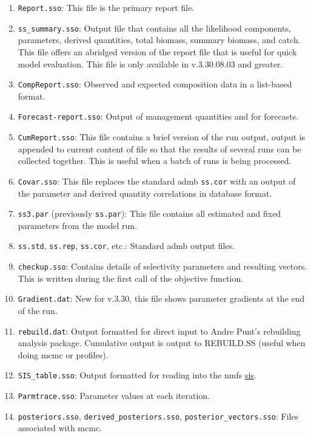 \begin{enumerate}
	\item \texttt{Report.sso}: This file is the primary report file.
	\item \texttt{ss\_summary.sso}: Output file that contains all the likelihood components, parameters, derived quantities, total biomass, summary biomass, and catch. This file offers an abridged version of the report file that is useful for quick model evaluation. This file is only available in v.3.30.08.03 and greater.
	\item \texttt{CompReport.sso}: Observed and expected composition data in a list-based format.
	\item \texttt{Forecast-report.sso}: Output of management quantities and for forecasts.
	\item \texttt{CumReport.sso}: This file contains a brief version of the run output, output is appended to current content of file so that the results of several runs can be collected together. This is useful when a batch of runs is being processed.
	\item \texttt{Covar.sso}: This file replaces the standard \gls{admb} \texttt{ss.cor} with an output of the parameter and derived quantity correlations in database format.
	\item \texttt{ss3.par} (previously \texttt{ss.par}): This file contains all estimated and fixed parameters from the model run. 
	\item \texttt{ss.std}, \texttt{ss.rep}, \texttt{ss.cor}, etc.: Standard \gls{admb} output files.
	\item \texttt{checkup.sso}: Contains details of selectivity parameters and resulting vectors. This is written during the first call of the objective function.
	\item \texttt{Gradient.dat}: New for v.3.30, this file shows parameter gradients at the end of the run.
	\item \texttt{rebuild.dat}: Output formatted for direct input to Andre Punt's rebuilding analysis package. Cumulative output is output to REBUILD.SS (useful when doing \gls{mcmc} or profiles).
	\item \texttt{SIS\_table.sso}: Output formatted for reading into the \gls{nmfs} \href{https://www.st.nmfs.noaa.gov/sis/}{\gls{sis}}.
	\item \texttt{Parmtrace.sso}: Parameter values at each iteration.
	\item \texttt{posteriors.sso}, \texttt{derived\_posteriors.sso}, \texttt{posterior\_vectors.sso}: Files associated with \gls{mcmc}.
\end{enumerate}

